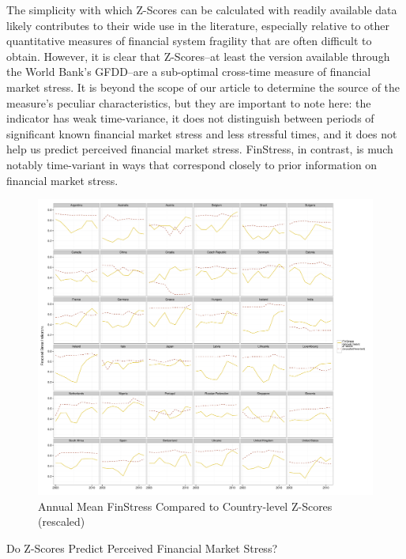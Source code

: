 \documentclass[]{article}
\begin{document}
The simplicity with which Z-Scores can be calculated with readily available data likely contributes to their wide use in the literature, especially relative to other quantitative measures of financial system fragility that are often difficult to obtain. However, it is clear that Z-Scores--at least the version available through the World Bank's GFDD--are a sub-optimal cross-time measure of financial market stress. It is beyond the scope of our article to determine the source of the measure's peculiar characteristics, but they are important to note here: the indicator has weak time-variance, it does not distinguish between periods of significant known financial market stress and less stressful times, and it does not help us predict perceived financial market stress. FinStress, in contrast, is much notably time-variant in ways that correspond closely to prior information on financial market stress.

\begin{figure}

    \caption{Annual Mean FinStress Compared to Country-level Z-Scores (rescaled)}
    \label{z_score}

    \begin{center}
        \includegraphics[scale=0.4]{figures/compare_to_z-score.pdf}
    \end{center}

\end{figure}

\begin{table}[H]
    \caption{Do Z-Scores Predict Perceived Financial Market Stress?}
    \label{finstress_z_regress}

    \begin{center}
    {\tiny{
        
    }}
    \end{center}
\end{table}
\end{document}
